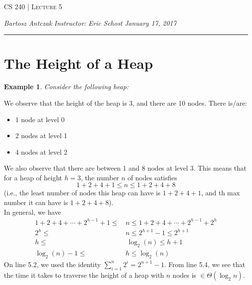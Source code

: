 \documentclass{report}
\newcommand{\lectureNum}{5}
\newcommand{\curDate}{January 17, 2017}
\newcommand{\course}{CS 240}
\newtheorem{ex}{Example}[section]
\begin{document}
\begin{center}
\begin{Large}
\textsc{\course{} | Lecture \lectureNum{}}
\end{Large}
\end{center} 
\noindent \textit{Bartosz Antczak} \hfill
\textit{Instructor: Eric Schost} \hfill
\textit{\curDate{}}
\rule{\textwidth}{0.4pt}

\section{The Height of a Heap}
\begin{ex}
Consider the following heap:
\end{ex}
\begin{center}
\end{center}
We observe that the height of the heap is 3, and there are 10 nodes. There is/are:
\begin{itemize}
\item 1 node at level 0
\item 2 nodes at level 1
\item 4 nodes at level 2
\end{itemize}
We also observe that there are between 1 and 8 nodes at level 3. This means that for a heap of height $h=3$, the number $n$ of nodes satisfies
$$1+2+4+1 \leq n \leq 1+2+4+8$$
(i.e., the least number of nodes this heap can have is $1+2+4+1$, and th max number it can have is $1+2+4+8$).\\
In general, we have
\begin{align}
1+2+4+\cdots+2^{h-1} + 1 \leq \, &n \leq 1+2+4+\cdots + 2^{h-1} + 2^h \\
2^h \leq \, &n \leq 2^{h+1} -1 \leq 2^{h+1} \\
h \leq & \, \log_2(n) \leq h+1 \\
\log_2(n)-1 \leq \, &h \leq \log_2(n)
\end{align}
On line 5.2, we used the identity $\displaystyle \sum_{i=1}^n 2^i = 2^{n+1} - 1$. From line 5.4, we see that the time it takes to traverse the height of a heap with $n$ nodes is $\in \Theta(\log_2 n)$.
\end{document}
